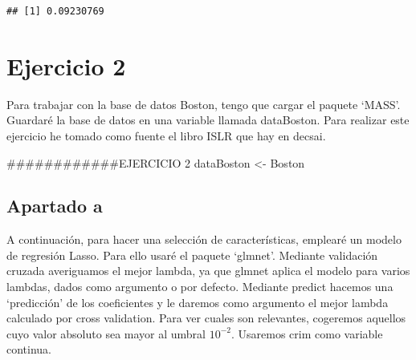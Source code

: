 \documentclass[]{article}
\newenvironment{Shaded}{\begin{snugshade}}{\end{snugshade}}
\newcommand{\StringTok}[1]{\textcolor[rgb]{0.31,0.60,0.02}{{#1}}}
\newcommand{\NormalTok}[1]{{#1}}
\begin{document}
\begin{verbatim}
## [1] 0.09230769
\end{verbatim}

\section{Ejercicio 2}\label{ejercicio-2}

Para trabajar con la base de datos Boston, tengo que cargar el paquete
`MASS'. Guardaré la base de datos en una variable llamada dataBoston.
Para realizar este ejercicio he tomado como fuente el libro ISLR que hay
en decsai.

\begin{Shaded}
\begin{Highlighting}[]
\NormalTok{############EJERCICIO 2}
\NormalTok{dataBoston <-}\StringTok{ }\NormalTok{Boston}
\end{Highlighting}
\end{Shaded}

\subsection{Apartado a}\label{apartado-a}

A continuación, para hacer una selección de características, emplearé un
modelo de regresión Lasso. Para ello usaré el paquete `glmnet'. Mediante
validación cruzada averiguamos el mejor lambda, ya que glmnet aplica el
modelo para varios lambdas, dados como argumento o por defecto. Mediante
predict hacemos una `predicción' de los coeficientes y le daremos como
argumento el mejor lambda calculado por cross validation. Para ver
cuales son relevantes, cogeremos aquellos cuyo valor absoluto sea mayor
al umbral \(10^{-2}\). Usaremos crim como variable continua.
\end{document}

